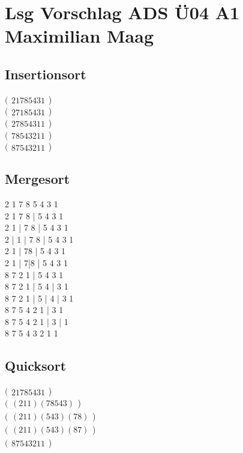 \documentclass{article}
\begin{document}
	\section*{Lsg Vorschlag ADS Ü04 A1 Maximilian Maag}
	\subsection*{Insertionsort}
	$
	(\begin{array}{c}
	2 1 7 8 5 4 3 1
	\end{array}
	$) \\
	$
	(\begin{array}{c}
	2 7 1 8 5 4 3 1
	\end{array}
	$) \\
	$
	(\begin{array}{c}
	2 7 8 5 4 3 1 1
	\end{array}
	$) \\
	$
	(\begin{array}{c}
	7 8 5 4 3 2 1 1
	\end{array}
	$) \\
	$
	(\begin{array}{c}
	8 7 5 4 3 2 1 1
	\end{array}
	$) \\
	
	\subsection*{Mergesort}
	
	2 1 7 8 5 4 3 1 \\
	2 1 7 8 | 5 4 3 1 \\
	2 1 | 7 8 | 5 4 3 1 \\
	2 | 1 | 7 8 | 5 4 3 1 \\
	2 1 | 78 | 5 4 3 1 \\
	2 1 | 7|8 | 5 4 3 1 \\
	8 7 2 1 | 5 4 3 1 \\
	8 7 2 1 | 5 4 | 3 1 \\
	8 7 2 1 | 5 | 4 | 3 1 \\
	8 7 5 4 2 1 | 3 1 \\
	8 7 5 4 2 1 | 3 | 1 \\
	8 7 5 4 3 2 1 1
	
	\subsection*{Quicksort}
	$
	(\begin{array}{c}
	2 1 7 8 5 4 3 1
	\end{array}
	$) \\
	$
	(\begin{array}{c}
	(2 1 1) (7 8 5 4 3)  
	\end{array}
	$) \\
	$
	(\begin{array}{c}
	(2 1 1) (5 4 3)(7 8 )  
	\end{array}
	$) \\
	$
	(\begin{array}{c}
	(2 1 1) (5 4 3)(8 7)  
	\end{array}
	$) \\
	$
	(\begin{array}{c}
	8 7 5 4 3 2 1 1
	\end{array}
	$)
\end{document}
